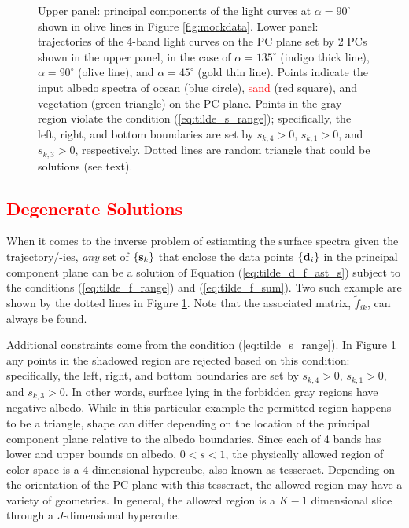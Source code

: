 \documentclass[iop,numberedappendix,apj]{emulateapj}
\def\fast{\tilde f}
\def\edit#1{\textcolor{red}{#1}}
\begin{document}
\begin{figure}[t]
\begin{center}
    \end{center}
    \caption{Upper panel: principal components of the light curves at $\alpha = 90^{\circ }$ shown in olive lines in Figure \ref{fig:mockdata}. Lower panel: trajectories of the 4-band light curves on the PC plane set by 2 PCs shown in the upper panel, in the case of $\alpha = 135^{\circ }$ (indigo thick line), $\alpha = 90^{\circ }$ (olive line), and $\alpha = 45^{\circ }$ (gold thin line). Points indicate the input albedo spectra of ocean (blue circle), \edit{sand} (red square), and vegetation (green triangle) on the PC plane. Points in the gray region violate the condition (\ref{eq:tilde_s_range}); specifically, the left, right, and bottom boundaries are set by $s_{k,4} > 0$, $s_{k,1} > 0$, and $s_{k,3}> 0$, respectively. 
Dotted lines are random triangle that could be solutions (see text). }
    \label{fig:trajectory}
\end{figure}

\subsection{\edit{Degenerate Solutions}}
\label{ss:degeneracy}

When it comes to the inverse problem of estiamting the surface spectra given the trajectory/-ies, {\it any} set of $\{ {\bf s}_k \}$ that enclose the data points $\{{\bf d}_i\}$ in the principal component plane can be a solution of Equation (\ref{eq:tilde_d_f_ast_s}) subject to the conditions (\ref{eq:tilde_f_range}) and (\ref{eq:tilde_f_sum}). 
Two such example are shown by the dotted lines in Figure \ref{fig:trajectory}. 
Note that the associated matrix, $\fast _{ik}$, can always be found. 

Additional constraints come from the condition (\ref{eq:tilde_s_range}). 
In Figure \ref{fig:trajectory} any points in the shadowed region are rejected based on this condition: specifically, the left, right, and bottom boundaries are set by $s_{k,4}> 0$, $s_{k,1}> 0$, and $s_{k,3}> 0$. 
In other words, surface lying in the forbidden gray regions have negative albedo. 
While in this particular example the permitted region happens to be a triangle, shape can differ depending on the location of the principal component plane relative to the albedo boundaries. 
Since each of 4 bands has lower and upper bounds on albedo, $0<s<1$, the physically allowed region of color space is a 4-dimensional hypercube, also known as tesseract. Depending on the orientation of the PC plane with this tesseract, the allowed region may have a variety of geometries. 
In general, the allowed region is a $K-1$ dimensional slice through a $J$-dimensional hypercube. 
\end{document}
